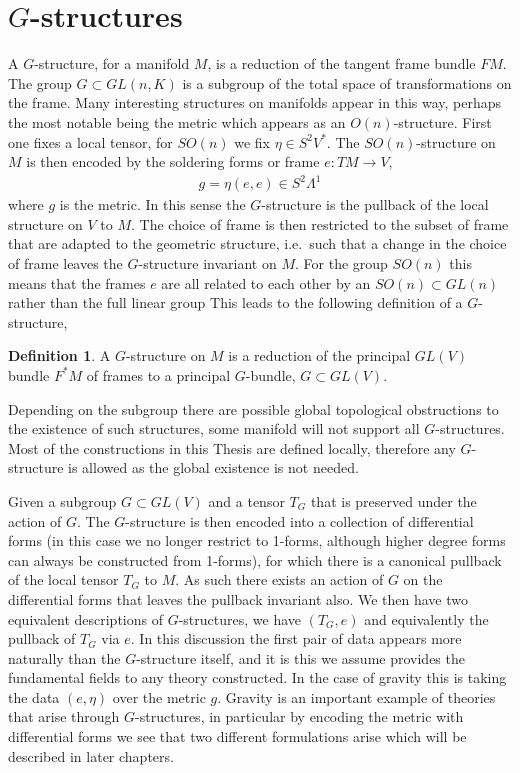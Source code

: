 \documentclass[10pt]{report}
\theoremstyle{definition}
\newtheorem{definition}{Definition}[chapter]
\begin{document}
\section{\texorpdfstring{$G$}{G}-structures}
A $G$-structure, for a manifold $M$, is a reduction of the tangent frame bundle $FM$. The group $G \subset GL(n,K)$ is a subgroup of the total space of transformations on the frame. Many interesting structures on manifolds appear in this way, perhaps the most notable being the metric which appears as an $O(n)$-structure. First one fixes a local tensor, for $SO(n)$ we fix $\eta \in S^2 V^*$. The $SO(n)$-structure on $M$ is then encoded by the soldering forms or frame $e : TM \rightarrow V$, 
\begin{align}
    g = \eta(e,e) \in S^2 \Lambda^1
\end{align}
where $g$ is the metric. In this sense the $G$-structure is the pullback of the local structure on $V$ to $M$. The choice of frame is then restricted to the subset of frame that are adapted to the geometric structure, i.e.~such that a change in the choice of frame leaves the $G$-structure invariant on $M$. For the group $SO(n)$ this means that the frames $e$ are all related to each other by an $SO(n) \subset GL(n)$ rather than the full linear group  This leads to the following definition of a $G$-structure, 
\begin{definition}
    A $G$-structure on $M$ is a reduction of the principal $GL(V)$ bundle $F^*M$ of frames to a principal $G$-bundle, $G \subset GL(V)$.
\end{definition}
Depending on the subgroup there are possible global topological obstructions to  the existence of such structures, some manifold will not support all $G$-structures. Most of the constructions in this Thesis are defined locally, therefore any $G$-structure is allowed as the global existence is not needed. 

Given a subgroup $G \subset GL(V)$ and a tensor $T_G$ that is preserved under the action of $G$. The $G$-structure is then encoded into a collection of differential forms (in this case we no longer restrict to 1-forms, although higher degree forms can always be constructed from 1-forms), for which there is a canonical pullback of the local tensor $T_G$ to $M$. As such there exists an action of $G$ on the differential forms that leaves the pullback invariant also. We then have two equivalent descriptions of $G$-structures, we have $(T_G,e)$ and equivalently the pullback of $T_G$ via $e$. In this discussion the first pair of data appears more naturally than the $G$-structure itself, and it is this we assume provides the fundamental fields to any theory constructed. In the case of gravity this is taking the data $(e,\eta)$ over the metric $g$. Gravity is an important example of theories that arise through $G$-structures, in particular by encoding the metric with differential forms we see that two different formulations arise which will be described in later chapters.
\end{document}
